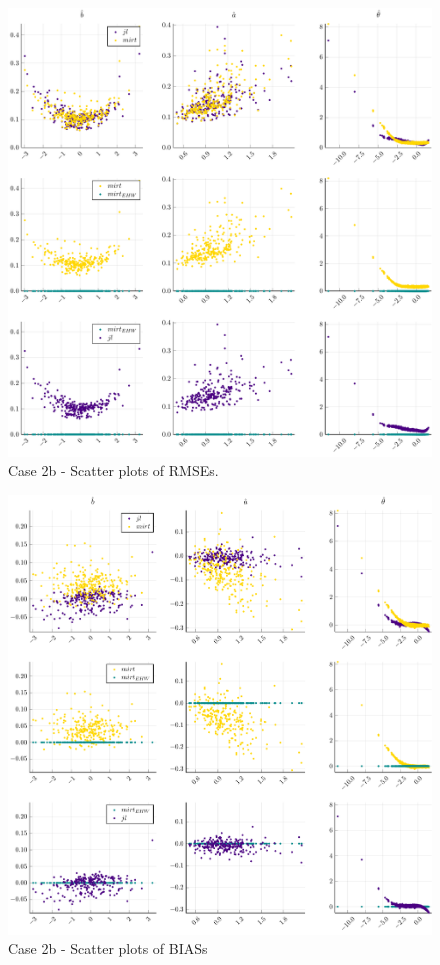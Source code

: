 \begin{figure}[H] 
	\centering
	\includegraphics[width=\textwidth]{Figures/2b/RMSEscatter.pdf}
	\caption{Case 2b - Scatter plots of RMSEs.}
	\label{fig:spRMSE2b}
\end{figure}
\begin{figure}[H] 
	\centering
	\includegraphics[width=\textwidth]{Figures/2b/BIASscatter.pdf}
	\caption{Case 2b - Scatter plots of BIASs }
	\label{fig:spBIAS2b}
\end{figure}
